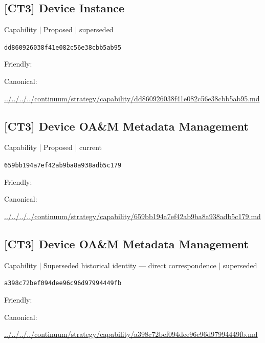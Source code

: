 \documentclass[10pt,a4paper]{article}
\begin{document}
\subsection*{[CT3] Device Instance}
{\small Capability | Proposed | superseded}\par
\texttt{dd860926038f41e082c56e38cbb5ab95}\par
Friendly: \par
Canonical: \par
{\footnotesize\url{../../../../continuum/strategy/capability/dd860926038f41e082c56e38cbb5ab95.md}}\par
\subsection*{[CT3] Device OA\&M Metadata Management}
{\small Capability | Proposed | current}\par
\texttt{659bb194a7ef42ab9ba8a938adb5c179}\par
Friendly: \par
Canonical: \par
{\footnotesize\url{../../../../continuum/strategy/capability/659bb194a7ef42ab9ba8a938adb5c179.md}}\par
\subsection*{[CT3] Device OA\&M Metadata Management}
{\small Capability | Superseded historical identity — direct correspondence | superseded}\par
\texttt{a398c72bef094dee96c96d97994449fb}\par
Friendly: \par
Canonical: \par
{\footnotesize\url{../../../../continuum/strategy/capability/a398c72bef094dee96c96d97994449fb.md}}\par
\end{document}
